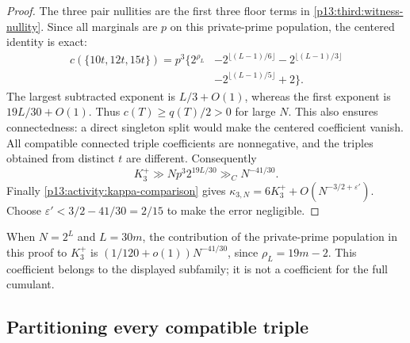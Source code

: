 \begin{proof}
The three pair nullities are the first three floor terms in
\eqref{p13:third:witness-nullity}.  Since all marginals are $p$ on
this private-prime population, the centered identity is exact:
\begin{equation}
 \begin{split}
 c(\{10t,12t,15t\})=p^3\biggl\{2^{\rho_L}
  &-2^{\lfloor(L-1)/6\rfloor}-2^{\lfloor(L-1)/3\rfloor}\\
  &-2^{\lfloor(L-1)/5\rfloor}+2\biggr\}.
 \end{split}
 \label{p13:third:witness-centered}
\end{equation}
The largest subtracted exponent is $L/3+O(1)$, whereas the first
exponent is $19L/30+O(1)$.  Thus $c(T)\geq q(T)/2>0$ for large $N$.
This also ensures connectedness: a direct singleton split would make
the centered coefficient vanish.
All compatible connected triple coefficients are nonnegative, and
the triples obtained from distinct $t$ are different.  Consequently
\[
 K_3^+\gg Np^3 2^{19L/30}
                 \gg_C N^{-41/30}.
\]
Finally \eqref{p13:activity:kappa-comparison} gives
$\kappa_{3,N}=6K_3^++O(N^{-3/2+\varepsilon'})$.
Choose $\varepsilon'<3/2-41/30=2/15$ to make the error negligible.
\end{proof}

When $N=2^L$ and $L=30m$, the contribution of the private-prime
population in this proof to $K_3^+$ is
$(1/120+o(1))N^{-41/30}$, since $\rho_L=19m-2$.
This coefficient belongs to the displayed subfamily; it is not a
coefficient for the full cumulant.

\subsection{Partitioning every compatible triple}

